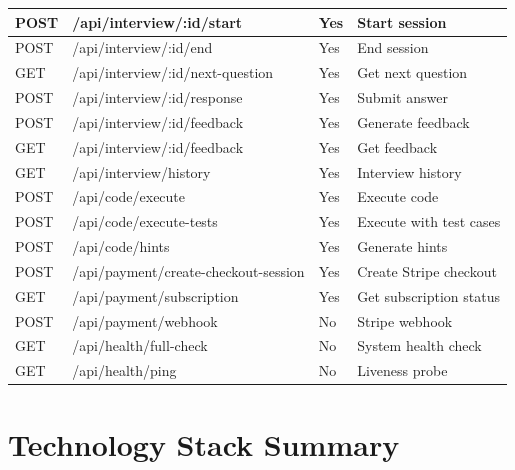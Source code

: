 \begin{appendices}
\begin{longtable}{|L{1.5cm}|L{5.5cm}|L{1.8cm}|p{5.8cm}|}
\hline
POST & /api/interview/:id/start & Yes & Start session \\
\hline
POST & /api/interview/:id/end & Yes & End session \\
\hline
GET & /api/interview/:id/next-question & Yes & Get next question \\
\hline
POST & /api/interview/:id/response & Yes & Submit answer \\
\hline
POST & /api/interview/:id/feedback & Yes & Generate feedback \\
\hline
GET & /api/interview/:id/feedback & Yes & Get feedback \\
\hline
GET & /api/interview/history & Yes & Interview history \\
\hline
POST & /api/code/execute & Yes & Execute code \\
\hline
POST & /api/code/execute-tests & Yes & Execute with test cases \\
\hline
POST & /api/code/hints & Yes & Generate hints \\
\hline
POST & /api/payment/create-checkout-session & Yes & Create Stripe checkout \\
\hline
GET & /api/payment/subscription & Yes & Get subscription status \\
\hline
POST & /api/payment/webhook & No & Stripe webhook \\
\hline
GET & /api/health/full-check & No & System health check \\
\hline
GET & /api/health/ping & No & Liveness probe \\
\hline
\end{longtable}

\section{Technology Stack Summary}


\end{appendices}
